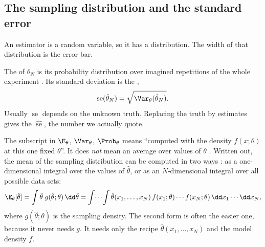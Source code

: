 \subsection{The sampling distribution and the standard error}
\label{3a:sec:sampdist}

An estimator is a random variable, so it has a distribution. The width of
that distribution is the error bar.

\begin{workdef}
The  of $\hat\theta_N$ is its probability
distribution over imagined repetitions of the whole experiment . Its standard deviation is the ,
\begin{equation}
  \operatorname{se}(\hat\theta_N)=\sqrt{\Var_\theta(\hat\theta_N)} .
  \label{3a:eq:se}
\end{equation}
Usually $\operatorname{se}$ depends on the unknown truth. Replacing the truth
by estimates gives the 
$\widehat{\operatorname{se}}$, the number we actually quote.
\end{workdef}

The subscript in $\E_\theta$, $\Var_\theta$, $\Prob_\theta$ means ``computed
with the density $f(x;\theta)$ at this one fixed $\theta$''. It does
\emph{not} mean an average over values of $\theta$ . Written
out, the mean of the sampling distribution can be computed in two ways
: as a one-dimensional integral over the values of
$\hat\theta$, or as an $N$-dimensional integral over all possible data sets:
\begin{equation}
  \E_\theta[\hat\theta]
  =\int\hat\theta\;g(\hat\theta;\theta)\,\dd\hat\theta
  =\int\!\cdots\!\int \hat\theta(x_1,\dots,x_N)\,
   f(x_1;\theta)\cdots f(x_N;\theta)\,\dd x_1\cdots\dd x_N ,
  \label{3a:eq:expect-estimator}
\end{equation}
where $g(\hat\theta;\theta)$ is the sampling density. The second form is
often the easier one, because it never needs $g$. It needs only the recipe
$\hat\theta(x_1,\dots,x_N)$ and the model density $f$.

